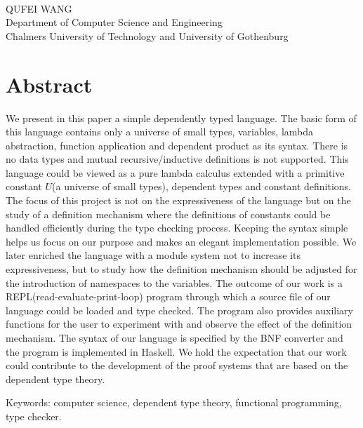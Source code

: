 \oneLineTitle\\
QUFEI WANG\\
Department of Computer Science and Engineering\\
Chalmers University of Technology and University of Gothenburg\setlength{\parskip}{0.5cm}

\thispagestyle{plain}			%
\setlength{\parskip}{0pt plus 1.0pt}
\section*{Abstract}
We present in this paper a simple dependently typed language. The basic form of this language contains only a universe of small types, variables, lambda abstraction, function application and dependent product as its syntax. There is no data types and mutual recursive/inductive definitions is not supported. This language could be viewed as a pure lambda calculus extended with a primitive constant $U$(a universe of small types), dependent types and constant definitions. The focus of this project is not on the expressiveness of the language but on the study of a definition mechanism where the definitions of constants could be handled efficiently during the type checking process. Keeping the syntax simple helps us focus on our purpose and makes an elegant implementation possible. We later enriched the language with a module system not to increase its expressiveness, but to study how the definition mechanism should be adjusted for the introduction of namespaces to the variables. The outcome of our work is a REPL(read-evaluate-print-loop) program through which a source file of our language could be loaded and type checked. The program also provides auxiliary functions for the user to experiment with and observe the effect of the definition mechanism. The syntax of our language is specified by the BNF converter and the program is implemented in Haskell. We hold the expectation that our work could contribute to the development of the proof systems that are based on the dependent type theory.

\vfill
Keywords: computer science, dependent type theory, functional programming, type checker.

\newpage				%
\thispagestyle{empty}
\mbox{}